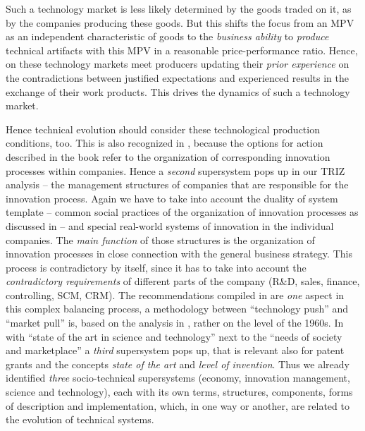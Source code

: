 \documentclass[11pt,a4paper]{article}
\begin{document}
Such a technology market is less likely determined by the goods traded on it,
as by the companies producing these goods.  But this shifts the focus from an
MPV as an independent characteristic of goods to the \emph{business ability}
to \emph{produce} technical artifacts with this MPV in a reasonable
price-performance ratio.  Hence, on these technology markets meet producers
updating their \emph{prior experience} on the contradictions between justified
expectations and experienced results in the exchange of their work products.
This drives the dynamics of such a technology market.

Hence technical evolution should consider these technological production
conditions, too. This is also recognized in \cite{TESE2018}, because the
options for action described in the book refer to the organization of
corresponding innovation processes within companies. Hence a \emph{second}
supersystem pops up in our TRIZ analysis -- the management structures of
companies that are responsible for the innovation process. Again we have to
take into account the duality of system template -- common social practices of
the organization of innovation processes as discussed in \cite{Preez2006} --
and special real-world systems of innovation in the individual companies. The
\emph{main function} of those structures is the organization of innovation
processes in close connection with the general business strategy. This process
is contradictory by itself, since it has to take into account the
\emph{contradictory requirements} of different parts of the company (R\&D,
sales, finance, controlling, SCM, CRM). The recommendations compiled in
\cite{TESE2018} are \emph{one} aspect in this complex balancing process, a
methodology between ``technology push'' and ``market pull'' is, based on the
analysis in \cite{Preez2006}, rather on the level of the 1960s. In
\cite[Fig.~3]{Preez2006} with ``state of the art in science and technology''
next to the ``needs of society and marketplace'' a \emph{third} supersystem
pops up, that is relevant also for patent grants and the concepts \emph{state
  of the art} and \emph{level of invention}.  Thus we already identified
\emph{three} socio-technical supersystems (economy, innovation management,
science and technology), each with its own terms, structures, components,
forms of description and implementation, which, in one way or another, are
related to the evolution of technical systems.
\end{document}
